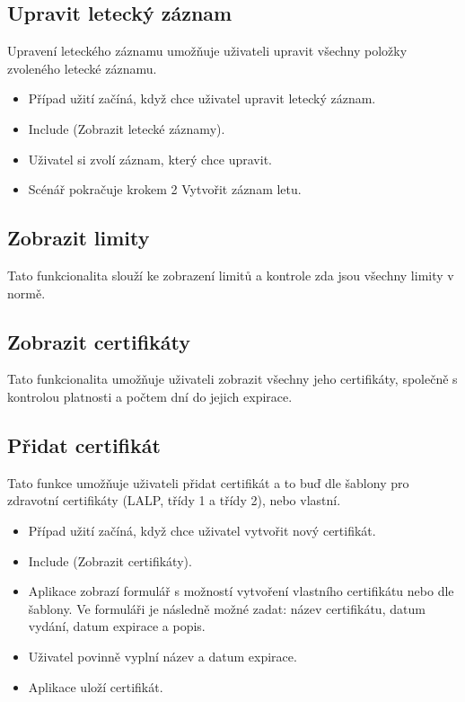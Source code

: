 \documentclass[thesis=M,czech]{FITthesis}[2012/06/26]
\begin{document}
\subsection{Upravit letecký záznam}
Upravení leteckého záznamu umožňuje uživateli upravit všechny položky zvoleného letecké záznamu.

\begin{itemize}
\item Případ užití začíná, když chce uživatel upravit letecký záznam.
\item Include (Zobrazit letecké záznamy).
\item Uživatel si zvolí záznam, který chce upravit.
\item Scénář pokračuje krokem 2 Vytvořit záznam letu.
\end{itemize}

\subsection{Zobrazit limity}
Tato funkcionalita slouží ke zobrazení limitů a kontrole zda jsou všechny limity v normě.

\subsection{Zobrazit certifikáty}
Tato funkcionalita umožňuje uživateli zobrazit všechny jeho certifikáty, společně s kontrolou platnosti a počtem dní do jejich expirace.

\subsection{Přidat certifikát}
Tato funkce umožňuje uživateli přidat certifikát a to buď dle šablony pro zdravotní certifikáty (LALP, třídy 1 a třídy 2), nebo vlastní.

\begin{itemize}
\item Případ užití začíná, když chce uživatel vytvořit nový certifikát.
\item Include (Zobrazit certifikáty).
\item Aplikace zobrazí formulář s možností vytvoření vlastního certifikátu nebo dle šablony. Ve formuláři je následně možné zadat: název certifikátu, datum vydání, datum expirace a popis.
\item Uživatel povinně vyplní název a datum expirace.
\item Aplikace uloží certifikát.
\end{itemize}
\end{document}
